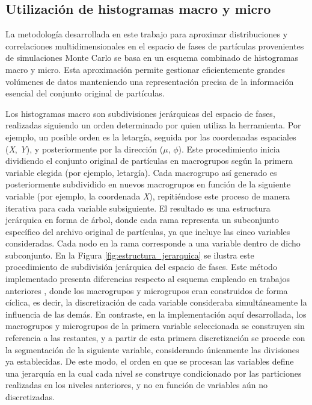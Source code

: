 \subsection{Utilización de histogramas macro y micro}
La metodología desarrollada en este trabajo para aproximar distribuciones y correlaciones multidimensionales en el espacio de fases de partículas provenientes de simulaciones Monte Carlo se basa en un esquema combinado de histogramas macro y micro. Esta aproximación permite gestionar eficientemente grandes volúmenes de datos manteniendo una representación precisa de la información esencial del conjunto original de partículas.

Los histogramas macro son subdivisiones jerárquicas del espacio de fases, realizadas siguiendo un orden determinado por quien utiliza la herramienta. Por ejemplo, un posible orden es la letargía, seguida por las coordenadas espaciales (\textit{X}, \textit{Y}), y posteriormente por la dirección (\textit{$\mu$}, \textit{$\phi$}). Este procedimiento inicia dividiendo el conjunto original de partículas en macrogrupos según la primera variable elegida (por ejemplo, letargía). Cada macrogrupo así generado es posteriormente subdividido en nuevos macrogrupos en función de la siguiente variable (por ejemplo, la coordenada \textit{X}), repitiéndose este proceso de manera iterativa para cada variable subsiguiente. El resultado es una estructura jerárquica en forma de árbol, donde cada rama representa un subconjunto específico del archivo original de partículas, ya que incluye las cinco variables consideradas. Cada nodo en la rama corresponde a  una variable dentro de dicho subconjunto. En la Figura \ref{fig:estructura_jerarquica} se ilustra este procedimiento de subdivisión jerárquica del espacio de fases. Este método implementado presenta diferencias respecto al esquema empleado en trabajos anteriores \cite{Fairhurst2017Hist}, donde los macrogrupos y microgrupos eran construidos de forma cíclica, es decir, la discretización de cada variable consideraba simultáneamente la influencia de las demás. En contraste, en la implementación aquí desarrollada, los macrogrupos y microgrupos de la primera variable seleccionada se construyen sin referencia a las restantes, y a partir de esta primera discretización se procede con la segmentación de la siguiente variable, considerando únicamente las divisiones ya establecidas. De este modo, el orden en que se procesan las variables define una jerarquía en la cual cada nivel se construye condicionado por las particiones realizadas en los niveles anteriores, y no en función de variables aún no discretizadas.

